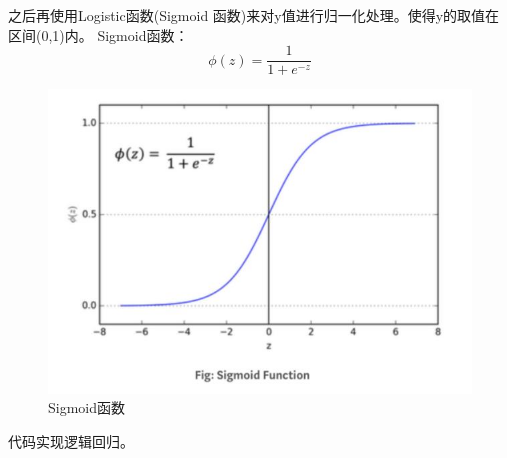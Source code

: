 \documentclass[openbib]{article}
\begin{document}
之后再使用Logistic函数(Sigmoid 函数)来对y值进行归一化处理。使得y的取值在区间(0,1)内。
Sigmoid函数：
$$\phi(z) = \frac{1}{1+e^{-z}}$$
\begin{figure}[htbp]
	\centering
	\includegraphics[scale=0.4]{Sigmoid.jpg}
	\caption{Sigmoid函数}
\end{figure}
代码实现逻辑回归。
\end{document}

